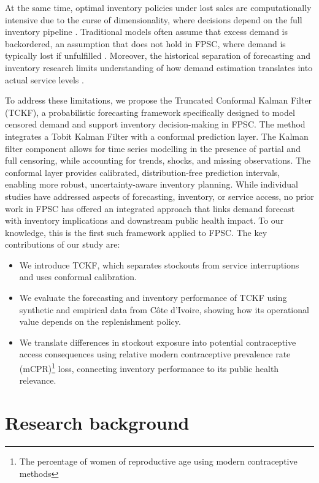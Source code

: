 \documentclass[
  11pt,
  authoryear,
  doubleblind,
  3p]{elsarticle}
\begin{document}
At the same time, optimal inventory policies under lost sales are
computationally intensive due to the curse of dimensionality, where
decisions depend on the full inventory pipeline \citep{bijvank2011}.
Traditional models often assume that excess demand is backordered, an
assumption that does not hold in FPSC, where demand is typically lost if
unfulfilled \citep{karimi2021, hewage2025}. Moreover, the historical
separation of forecasting and inventory research limits understanding of
how demand estimation translates into actual service levels
\citep{goltsos2022}.

To address these limitations, we propose the Truncated Conformal Kalman
Filter (TCKF), a probabilistic forecasting framework specifically
designed to model censored demand and support inventory decision-making
in FPSC. The method integrates a Tobit Kalman Filter with a conformal
prediction layer. The Kalman filter component allows for time series
modelling in the presence of partial and full censoring, while
accounting for trends, shocks, and missing observations. The conformal
layer provides calibrated, distribution-free prediction intervals,
enabling more robust, uncertainty-aware inventory planning. While
individual studies have addressed aspects of forecasting, inventory, or
service access, no prior work in FPSC has offered an integrated approach
that links demand forecast with inventory implications and downstream
public health impact. To our knowledge, this is the first such framework
applied to FPSC. The key contributions of our study are:

\begin{itemize}
\item
  We introduce TCKF, which separates stockouts from service
  interruptions and uses conformal calibration.
\item
  We evaluate the forecasting and inventory performance of TCKF using
  synthetic and empirical data from Côte d'Ivoire, showing how its
  operational value depends on the replenishment policy.
\item
  We translate differences in stockout exposure into potential
  contraceptive access consequences using relative modern contraceptive
  prevalence rate (mCPR)\footnote{The percentage of women of
    reproductive age using modern contraceptive methods} loss,
  connecting inventory performance to its public health relevance.
\end{itemize}

\section{Research background}\label{sec-lit_wp2}
\end{document}
